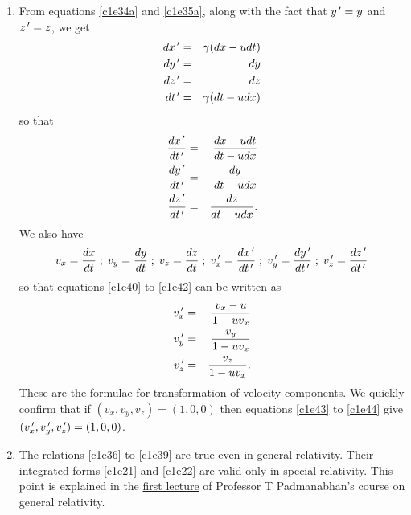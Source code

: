 \begin{enumerate}
\item From equations \eqref{c1e34a} and \eqref{c1e35a}, along with the fact that
$y^{\,\prime} = y$ and $z^{\,\prime} = z$, we get
\begin{eqnarray}
dx^{\,\prime} &=& \gamma(dx - udt) \label{c1e36} \\
dy^{\,\prime} &=& dy \label{c1e37} \\
dz^{\,\prime} &=& dz \label{c1e38} \\
dt^{\,\prime} &=& \gamma(dt - udx) \label{c1e39}
\end{eqnarray}
so that
\begin{eqnarray}
\frac{dx^{\,\prime}}{dt^{\,\prime}} &=& \frac{dx - udt}{dt - udx} \label{c1e40} \\
\frac{dy^{\,\prime}}{dt^{\,\prime}} &=& \frac{dy}{dt - udx} \label{c1e41} \\
\frac{dz^{\,\prime}}{dt^{\,\prime}} &=& \frac{dz}{dt - udx}. \label{c1e42}
\end{eqnarray}
We also have
\[
v_x = \frac{dx}{dt}\;;\;v_y = \frac{dy}{dt}\;;\;v_z = \frac{dz}{dt}\;;\;
v_x^{\,\prime} = \frac{dx^{\,\prime}}{dt^{\,\prime}}\;;\;v_y^{\,\prime} = \frac{dy^{\,\prime}}{dt^{\,\prime}}
\;;\;v_z^{\,\prime} = \frac{dz^{\,\prime}}{dt^{\,\prime}}
\]
so that equations \eqref{c1e40} to \eqref{c1e42} can be written as
\begin{eqnarray}
v_x^{\,\prime} &=& \frac{v_x - u}{1 - uv_x} \label{c1e43} \\
v_y^{\,\prime} &=& \frac{v_y}{1 - uv_x} \label{c1e44} \\
v_z^{\,\prime} &=& \frac{v_z}{1 - uv_x}. \label{c1e45} 
\end{eqnarray}
These are the formulae for transformation of velocity components. We
quickly confirm that if $(v_x, v_y, v_z) = (1, 0, 0)$ then equations 
\eqref{c1e43} to \eqref{c1e44} give $(v_x^{\,\prime}, v_y^{\,\prime}, v_z^{\,\prime}) = (1, 0, 0)$.

\item The relations \eqref{c1e36} to \eqref{c1e39} are true even in general
relativity. Their integrated forms \eqref{c1e21} and \eqref{c1e22} are valid
only in special relativity. This point is explained in the 
\href{https://www.youtube.com/watch?v=EotEgl8MMaw}{first lecture} of Professor 
T Padmanabhan's course on general relativity.


\end{enumerate}
